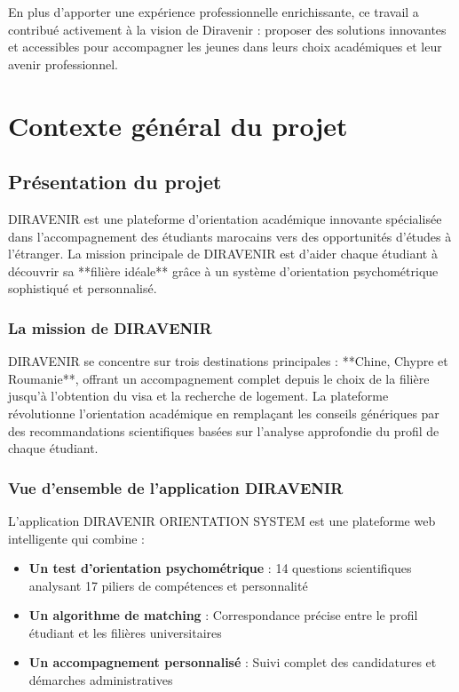 \documentclass[12pt,a4paper]{report}
\begin{document}
En plus d'apporter une expérience professionnelle enrichissante, ce travail a contribué activement à la vision de Diravenir : proposer des solutions innovantes et accessibles pour accompagner les jeunes dans leurs choix académiques et leur avenir professionnel.

\chapter{Contexte général du projet}

\section{Présentation du projet}

DIRAVENIR est une plateforme d'orientation académique innovante spécialisée dans l'accompagnement des étudiants marocains vers des opportunités d'études à l'étranger. La mission principale de DIRAVENIR est d'aider chaque étudiant à découvrir sa **filière idéale** grâce à un système d'orientation psychométrique sophistiqué et personnalisé.

\subsection{La mission de DIRAVENIR}

DIRAVENIR se concentre sur trois destinations principales : **Chine, Chypre et Roumanie**, offrant un accompagnement complet depuis le choix de la filière jusqu'à l'obtention du visa et la recherche de logement. La plateforme révolutionne l'orientation académique en remplaçant les conseils génériques par des recommandations scientifiques basées sur l'analyse approfondie du profil de chaque étudiant.

\subsection{Vue d'ensemble de l'application DIRAVENIR}

L'application DIRAVENIR ORIENTATION SYSTEM est une plateforme web intelligente qui combine :

\begin{itemize}
    \item \textbf{Un test d'orientation psychométrique} : 14 questions scientifiques analysant 17 piliers de compétences et personnalité
    \item \textbf{Un algorithme de matching} : Correspondance précise entre le profil étudiant et les filières universitaires
    \item \textbf{Un accompagnement personnalisé} : Suivi complet des candidatures et démarches administratives
\end{itemize}
\end{document}
